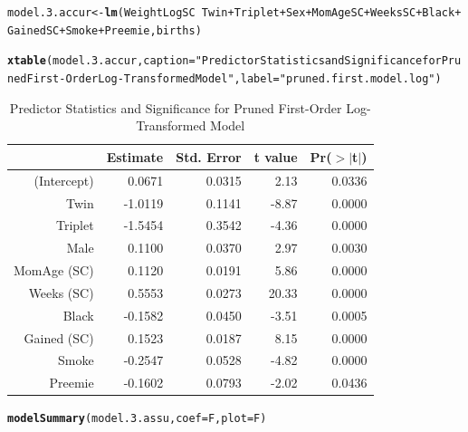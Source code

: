 \documentclass{article}\usepackage[]{graphicx}\usepackage[]{xcolor}
\makeatletter
\newcommand{\hlstr}[1]{\textcolor[rgb]{0.192,0.494,0.8}{#1}}%
\newcommand{\hlopt}[1]{\textcolor[rgb]{0,0,0}{#1}}%
\newcommand{\hlstd}[1]{\textcolor[rgb]{0.345,0.345,0.345}{#1}}%
\newcommand{\hlkwb}[1]{\textcolor[rgb]{0.69,0.353,0.396}{#1}}%
\newcommand{\hlkwc}[1]{\textcolor[rgb]{0.333,0.667,0.333}{#1}}%
\newcommand{\hlkwd}[1]{\textcolor[rgb]{0.737,0.353,0.396}{\textbf{#1}}}%
\newenvironment{kframe}{%
 \def\at@end@of@kframe{}%
 \ifinner\ifhmode%
  \def\at@end@of@kframe{\end{minipage}}%
  \begin{minipage}{\columnwidth}%
 \fi\fi%
 \def\FrameCommand##1{\hskip\@totalleftmargin \hskip-\fboxsep
 \colorbox{shadecolor}{##1}\hskip-\fboxsep
     \hskip-\linewidth \hskip-\@totalleftmargin \hskip\columnwidth}%
 \MakeFramed {\advance\hsize-\width
   \@totalleftmargin\z@ \linewidth\hsize
   \@setminipage}}%
 {\par\unskip\endMakeFramed%
 \at@end@of@kframe}
\newenvironment{knitrout}{}{} %
\makeatother
\begin{document}
\begin{knitrout}
\color{fgcolor}\begin{kframe}
\begin{alltt}
\hlstd{model.3.accur} \hlkwb{<-} \hlkwd{lm}\hlstd{(WeightLogSC} \hlopt{~} \hlstd{Twin} \hlopt{+} \hlstd{Triplet} \hlopt{+} \hlstd{Sex} \hlopt{+} \hlstd{MomAgeSC} \hlopt{+} \hlstd{WeeksSC} \hlopt{+} \hlstd{Black} \hlopt{+}
                      \hlstd{GainedSC} \hlopt{+} \hlstd{Smoke} \hlopt{+} \hlstd{Preemie, births)}

\hlkwd{xtable}\hlstd{(model.3.accur,} \hlkwc{caption}\hlstd{=}\hlstr{"Predictor Statistics and Significance for Pruned First-Order Log-Transformed Model"}\hlstd{,} \hlkwc{label}\hlstd{=}\hlstr{"pruned.first.model.log"}\hlstd{)}
\end{alltt}
\end{kframe}
\end{knitrout}
\begin{table}[H]
\centering
\begin{tabular}{rrrrr}
  \hline
 & Estimate & Std. Error & t value & Pr($>$$|$t$|$) \\ 
  \hline
(Intercept) & 0.0671 & 0.0315 & 2.13 & 0.0336 \\ 
  Twin & -1.0119 & 0.1141 & -8.87 & 0.0000 \\ 
  Triplet & -1.5454 & 0.3542 & -4.36 & 0.0000 \\ 
  Male & 0.1100 & 0.0370 & 2.97 & 0.0030 \\ 
  MomAge (SC) & 0.1120 & 0.0191 & 5.86 & 0.0000 \\ 
  Weeks (SC) & 0.5553 & 0.0273 & 20.33 & 0.0000 \\ 
  Black & -0.1582 & 0.0450 & -3.51 & 0.0005 \\ 
  Gained (SC) & 0.1523 & 0.0187 & 8.15 & 0.0000 \\ 
  Smoke & -0.2547 & 0.0528 & -4.82 & 0.0000 \\ 
  Preemie & -0.1602 & 0.0793 & -2.02 & 0.0436 \\ 
   \hline
\end{tabular}
\caption{Predictor Statistics and Significance for Pruned First-Order Log-Transformed Model} 
\label{pruned.first.model.log}
\end{table}

\begin{knitrout}
\color{fgcolor}\begin{kframe}
\begin{alltt}
\hlkwd{modelSummary}\hlstd{(model.3.assu,} \hlkwc{coef}\hlstd{=F,} \hlkwc{plot}\hlstd{=F)}
\end{alltt}
\end{kframe}
\end{knitrout}
\end{document}
